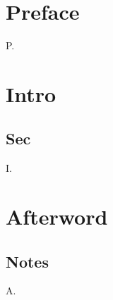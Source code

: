 \documentclass{book}
\begin{document}
\frontmatter
\chapter{Preface}
P.
\mainmatter
\chapter{Intro}
\section{Sec}
I.
\backmatter
\chapter{Afterword}
\section{Notes}
A.
\end{document}
